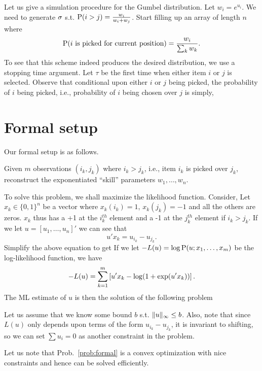 \documentclass[letterpaper, 12pt, reqno]{amsart}
\begin{document}
Let us give a simulation procedure for the Gumbel distribution. Let $w_i = e^{u_i}$. We need to generate $\s$ s.t. $\P(i > j) = \f{w_i}{w_i + w_j}$. Start filling up an array of length $n$ where
$$
\P(i \trm{ is picked for current position} ) = \f{w_i}{\sum_k w_k}.
$$
To see that this scheme indeed produces the desired distribution, we use a stopping time argument. Let $\tau$ be the first time when either item $i$ or $j$ is selected. Observe that conditional upon either $i$ or $j$ being picked, the probability of $i$ being picked, i.e., probability of $i$ being chosen over $j$ is simply,

\section{Formal setup}

Our formal setup is as follows.
\begin{problem}
\label{prob:formal}
Given $m$ observations $(i_k, j_k)$ where $i_k > j_k$, i.e., item $i_k$ is picked over $j_k$, reconstruct the exponentiated ``skill'' parameters $w_1, \ldots, w_n$.
\end{problem}
To solve this problem, we shall maximize the likelihood function. Consider,
Let $x_k \in \{ 0,1\}^n$ be a vector where $x_k(i_k) = 1$, $x_k(j_k) = -1$ and all the others are zeros. $x_k$ thus has a +1 at the $i_k^{th}$ element and a -1 at the $j_k^{th}$ element if $i_k > j_k$. If we let $u = [u_1, \ldots, u_n]'$ we can see that
$$
u' x_k = u_{i_k} - u_{j_k}.
$$
Simplify the above equation to get
If we let $-L(u) = \log \P(u; x_1, \ldots, x_m)$ be the log-likelihood function, we have
$$
-L(u) = \sum_{k=1}^m \sqbrac{u' x_k - \log(1+\exp(u'x_k))}.
$$
The ML estimate of $u$ is then the solution of the following problem
\begin{remark}
Let us assume that we know some bound $b$ s.t. $\norm{u}_\infty \leq b$. Also, note that since $L(u)$ only depends upon terms of the form $u_{i_k} - u_{j_k}$, it is invariant to shifting, so we can set $\sum u_i = 0$ as another constraint in the problem.

Let us note that Prob.~\ref{prob:formal} is a convex optimization with nice constraints and hence can be solved efficiently.
\end{remark}
\end{document}
